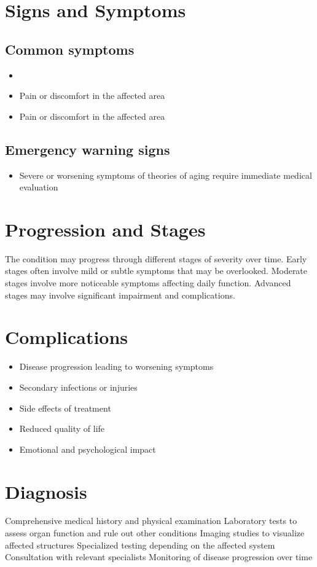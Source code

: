\section{Signs and Symptoms}

\subsection{Common symptoms}
\begin{itemize}[noitemsep]
  \item \item Pain or discomfort in the affected area    \item Pain or discomfort in the affected area
  \end{itemize}

\subsection{Emergency warning signs}
\begin{itemize}[noitemsep]
  \item Severe or worsening symptoms of theories of aging require immediate medical evaluation
\end{itemize}
\section{Progression and Stages}
The condition may progress through different stages of severity over time. Early stages often involve mild or subtle symptoms that may be overlooked. Moderate stages involve more noticeable symptoms affecting daily function. Advanced stages may involve significant impairment and complications.
\section{Complications}
\begin{itemize}[noitemsep]
  \item Disease progression leading to worsening symptoms
  \item Secondary infections or injuries
  \item Side effects of treatment
  \item Reduced quality of life
  \item Emotional and psychological impact
\end{itemize}
\section{Diagnosis}
Comprehensive medical history and physical examination Laboratory tests to assess organ function and rule out other conditions Imaging studies to visualize affected structures Specialized testing depending on the affected system Consultation with relevant specialists Monitoring of disease progression over time

